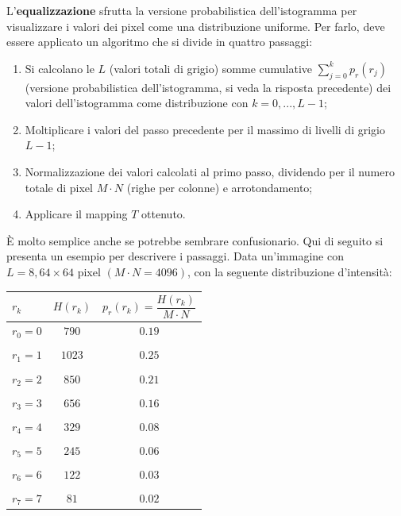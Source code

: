 \documentclass[a4paper]{article}
\begin{document}
	\noindent
	L'\textbf{equalizzazione} sfrutta la versione probabilistica dell'istogramma per visualizzare i valori dei pixel come una distribuzione uniforme. Per farlo, deve essere applicato un algoritmo che si divide in quattro passaggi:
	\begin{enumerate}
		\item Si calcolano le $L$ (valori totali di grigio) somme cumulative $\displaystyle\sum_{j = 0}^{k}p_{r}\left(r_{j}\right)$ (versione probabilistica dell'istogramma, si veda la risposta precedente) dei valori dell'istogramma come distribuzione con $k = 0, ..., L - 1$;
		
		\item Moltiplicare i valori del passo precedente per il massimo di livelli di grigio $L - 1$;
		
		\item Normalizzazione dei valori calcolati al primo passo, dividendo per il numero totale di pixel $M \cdot N$ (righe per colonne) e arrotondamento;
		
		\item Applicare il mapping $T$ ottenuto.
	\end{enumerate}
	È molto semplice anche se potrebbe sembrare confusionario. Qui di seguito si presenta un esempio per descrivere i passaggi.\newline
	Data un'immagine con $L = 8, 64\times64$ pixel $\left(M \cdot N = 4096\right)$, con la seguente distribuzione d'intensità:
	\begin{table}[!htbp]
		\centering
		\begin{tabular}{@{} l c c @{}}
			\toprule
			$r_{k}$ & $H\left(r_{k}\right)$ & $p_{r}\left(r_{k}\right) = \dfrac{H\left(r_{k}\right)}{M \cdot N}$ \\
			\midrule
			$r_{0} = 0$	& $790$	& $0.19$ \\
			&& \\
			$r_{1} = 1$	& $1023$& $0.25$ \\
			&& \\
			$r_{2} = 2$	& $850$	& $0.21$ \\
			&& \\
			$r_{3} = 3$	& $656$	& $0.16$ \\
			&& \\
			$r_{4} = 4$	& $329$	& $0.08$ \\
			&& \\
			$r_{5} = 5$	& $245$	& $0.06$ \\
			&& \\
			$r_{6} = 6$	& $122$	& $0.03$ \\
			&& \\
			$r_{7} = 7$	& $81$	& $0.02$ \\
			\bottomrule
		\end{tabular}
	\end{table}
	
\end{document}
